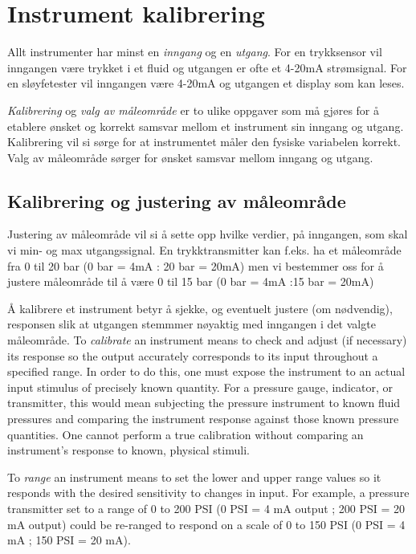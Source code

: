 
\chapter{Instrument kalibrering}

Allt instrumenter har minst en \textit{inngang} og en \textit{utgang}. For en trykksensor vil inngangen være trykket i et fluid og utgangen er ofte et 4-20mA strømsignal. For en sløyfetester vil inngangen være 4-20mA og utgangen et display som kan leses. 

\textit{Kalibrering} og \textit{valg av måleområde} er to ulike oppgaver som må gjøres for å etablere ønsket og korrekt samsvar mellom et instrument sin inngang og utgang. Kalibrering vil si sørge for at instrumentet måler den fysiske variabelen korrekt. Valg av måleområde sørger for ønsket samsvar mellom inngang og utgang. 





\filbreak
\section{Kalibrering og justering av måleområde}

Justering av måleområde vil si å sette opp hvilke verdier, på inngangen, som  skal vi min- og max utgangssignal. En trykktransmitter kan f.eks. ha et måleområde fra 0 til 20 bar (0 bar = 4mA : 20 bar = 20mA) men vi bestemmer oss for å justere måleområde til å være 0 til 15 bar (0 bar = 4mA :15 bar = 20mA)

Å kalibrere et instrument betyr å sjekke, og eventuelt justere (om nødvendig), responsen slik at utgangen stemmmer nøyaktig med inngangen i det valgte måleområde. 
To \textit{calibrate} an instrument means to check and adjust (if necessary) its response so the output accurately corresponds to its input throughout a specified range.  In order to do this, one must expose the instrument to an actual input stimulus of precisely known quantity.  For a pressure gauge, indicator, or transmitter, this would mean subjecting the pressure instrument to known fluid pressures and comparing the instrument response against those known pressure quantities.  One cannot perform a true calibration without comparing an instrument's response to known, physical stimuli.  

To \textit{range} an instrument means to set the lower and upper range values so it responds with the desired sensitivity to changes in input.  For example, a pressure transmitter set to a range of 0 to 200 PSI (0 PSI = 4 mA output ; 200 PSI = 20 mA output) could be re-ranged to respond on a scale of 0 to 150 PSI (0 PSI = 4 mA ; 150 PSI = 20 mA). 


